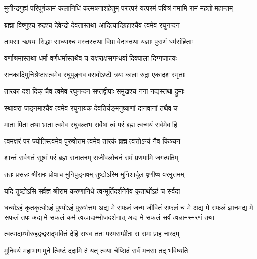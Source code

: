 \fourlineindentedshloka
{मुनीन्द्रगुह्यं परिपूर्णकामं}
{कलानिधिं कल्मषनाशहेतुम्}
{परात्परं यत्परमं पवित्रं}
{नमामि रामं महतो महान्तम्}%

\twolineshloka
{ब्रह्मा विष्णुश्च रुद्रश्च देवेन्द्रो देवतास्तथा}
{आदित्यादिग्रहाश्चैव त्वमेव रघुनन्दन}%

\twolineshloka
{तापसा ऋषयः सिद्धाः साध्याश्च मरुतस्तथा}
{विप्रा वेदास्तथा यज्ञाः पुराणं धर्मसंहिताः}%

\twolineshloka
{वर्णाश्रमास्तथा धर्मा वर्णधर्मास्तथैव च}
{यक्षराक्षसगन्धर्वा दिक्पाला दिग्गजादयः}%

\twolineshloka
{सनकादिमुनिश्रेष्ठास्त्वमेव रघुपुङ्गव}
{वसवोऽष्टौ त्रयः काला रुद्रा एकादश स्मृताः}%

\twolineshloka
{तारका दश दिक् चैव त्वमेव रघुनन्दन}
{सप्तद्वीपाः समुद्राश्च नगा नद्यस्तथा द्रुमाः}%

\twolineshloka
{स्थावरा जङ्गमाश्चैव त्वमेव रघुनायक}
{देवतिर्यङ्मनुष्याणां दानवानां तथैव च}%

\twolineshloka
{माता पिता तथा भ्राता त्वमेव रघुवल्लभ}
{सर्वेषां त्वं परं ब्रह्म त्वन्मयं सर्वमेव हि}%

\twolineshloka
{त्वमक्षरं परं ज्योतिस्त्वमेव पुरुषोत्तम}
{त्वमेव तारकं ब्रह्म त्वत्तोऽन्यं नैव किञ्चन}%

\twolineshloka
{शान्तं सर्वगतं सूक्ष्मं परं ब्रह्म सनातनम्}
{राजीवलोचनं रामं प्रणमामि जगत्पतिम्}%


\twolineshloka
{ततः प्रसन्नः श्रीरामः प्रोवाच मुनिपुङ्गवम्}
{तुष्टोऽस्मि मुनिशार्दूल वृणीष्व वरमुत्तमम्}%


\twolineshloka
{यदि तुष्टोऽसि सर्वज्ञ श्रीराम करुणानिधे}
{त्वन्मूर्तिदर्शनेनैव कृतार्थोऽहं च सर्वदा}%

\threelineshloka
{धन्योऽहं कृतकृत्योऽहं पुण्योऽहं पुरुषोत्तम}
{अद्य मे सफलं जन्म जीवितं सफलं च मे}%
{अद्य मे सफलं ज्ञानमद्य मे सफलं तपः}
\twolineshloka
{अद्य मे सफलं कर्म त्वत्पादाम्भोजदर्शनात्}
{अद्य मे सफलं सर्वं त्वन्नामस्मरणं तथा}%

\twolineshloka
{त्वत्पादाम्भोरुहद्वन्द्वसद्भक्तिं देहि राघव}
{ततः परमसम्प्रीतः स रामः प्राह नारदम्}%


\twolineshloka
{मुनिवर्य महाभाग मुने त्विष्टं ददामि ते}
{यत् त्वया चेप्सितं सर्वं मनसा तद् भविष्यति}%



